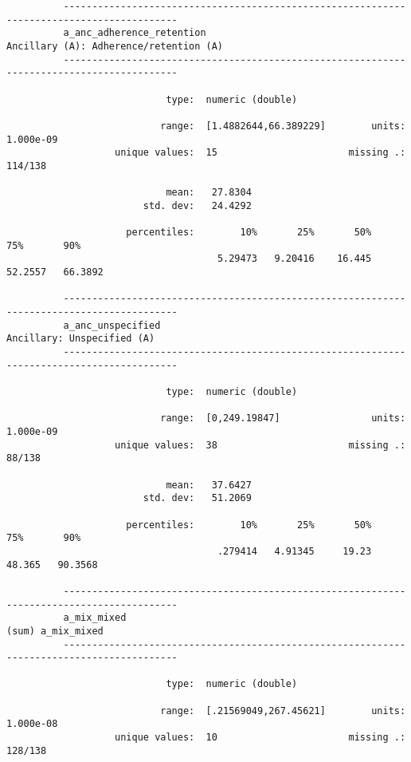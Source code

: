 \documentclass{article}
\begin{document}
\begin{verbatim}
          ------------------------------------------------------------------------------------------
          a_anc_adherence_retention                           Ancillary (A): Adherence/retention (A)
          ------------------------------------------------------------------------------------------
          
                            type:  numeric (double)
          
                           range:  [1.4882644,66.389229]        units:  1.000e-09
                   unique values:  15                       missing .:  114/138
          
                            mean:   27.8304
                        std. dev:   24.4292
          
                     percentiles:        10%       25%       50%       75%       90%
                                     5.29473   9.20416    16.445   52.2557   66.3892
          
          ------------------------------------------------------------------------------------------
          a_anc_unspecified                                               Ancillary: Unspecified (A)
          ------------------------------------------------------------------------------------------
          
                            type:  numeric (double)
          
                           range:  [0,249.19847]                units:  1.000e-09
                   unique values:  38                       missing .:  88/138
          
                            mean:   37.6427
                        std. dev:   51.2069
          
                     percentiles:        10%       25%       50%       75%       90%
                                     .279414   4.91345     19.23    48.365   90.3568
          
          ------------------------------------------------------------------------------------------
          a_mix_mixed                                                              (sum) a_mix_mixed
          ------------------------------------------------------------------------------------------
          
                            type:  numeric (double)
          
                           range:  [.21569049,267.45621]        units:  1.000e-08
                   unique values:  10                       missing .:  128/138
          

\end{verbatim}
\end{document}
